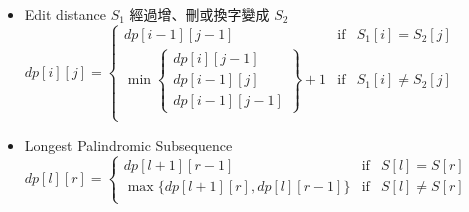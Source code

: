 \begin{itemize}

\item Edit distance
    \subitem $S_1$ 經過增、刪或換字變成 $S_2$
    \subitem $dp[i][j] = \left \{
        \begin{array}{lrc}
            dp[i-1][j-1] & \mbox{if} & S_1[i] = S_2[j] \\
            \min\left \{
                \begin{array}{c}
                    dp[i][j-1] \\ dp[i-1][j] \\ dp[i-1][j-1]
                \end{array}\right \}+1 & \mbox{if} & S_1[i] \neq S_2[j] \\
        \end{array}\right .$

\item Longest Palindromic Subsequence
    \subitem $dp[l][r] = \left \{
        \begin{array}{lrc}
            dp[l+1][r-1] & \mbox{if} & S[l] = S[r] \\
            \max\{dp[l+1][r], dp[l][r-1]\} & \mbox{if} & S[l] \neq S[r] \\
        \end{array}\right .$

\end{itemize}